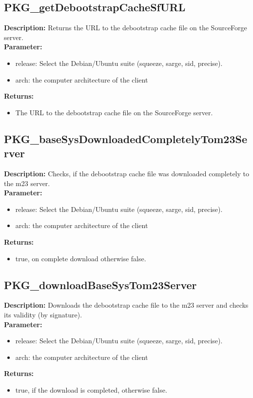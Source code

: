 \subsection{PKG\_getDebootstrapCacheSfURL}
\textbf{Description:} Returns the URL to the debootstrap cache file on the SourceForge server.\\
\textbf{Parameter:}
\begin{itemize}
\item release: Select the Debian/Ubuntu suite (squeeze, sarge, sid, precise).
\item arch: the computer architecture of the client
\end{itemize}
\textbf{Returns:}
\begin{itemize}
\item The URL to the debootstrap cache file on the SourceForge server.
\end{itemize}

\subsection{PKG\_baseSysDownloadedCompletelyTom23Server}
\textbf{Description:} Checks, if the debootstrap cache file was downloaded completely to the m23 server.\\
\textbf{Parameter:}
\begin{itemize}
\item release: Select the Debian/Ubuntu suite (squeeze, sarge, sid, precise).
\item arch: the computer architecture of the client
\end{itemize}
\textbf{Returns:}
\begin{itemize}
\item true, on complete download otherwise false.
\end{itemize}

\subsection{PKG\_downloadBaseSysTom23Server}
\textbf{Description:} Downloads the debootstrap cache file to the m23 server and checks its validity (by signature).\\
\textbf{Parameter:}
\begin{itemize}
\item release: Select the Debian/Ubuntu suite (squeeze, sarge, sid, precise).
\item arch: the computer architecture of the client
\end{itemize}
\textbf{Returns:}
\begin{itemize}
\item true, if the download is completed, otherwise false.
\end{itemize}

